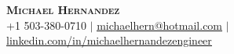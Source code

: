 \documentclass[a4paper,11pt]{article}
\begin{document}

\begin{center}
    \textbf{\Huge \scshape Michael Hernandez} \\ \vspace{1pt}
    \small +1 503-380-0710 
    $|$ 
    \href{mailto:michaelhern@hotmail.com}{\underline{michaelhern@hotmail.com}} 
    $|$ 
    \href{https://www.linkedin.com/in/michaelhernandezengineer/}{\underline{linkedin.com/in/michaelhernandezengineer}} 
\end{center}

\begin{comment}
\section{Summary}
\begin{itemize}[leftmargin=0.15in, label={}]
	\small{\item{Software engineering professional proficient in Python, and C++ with prior experience in embedded software validation and development.}}
\end{itemize}
\end{comment}

%
\end{document}
